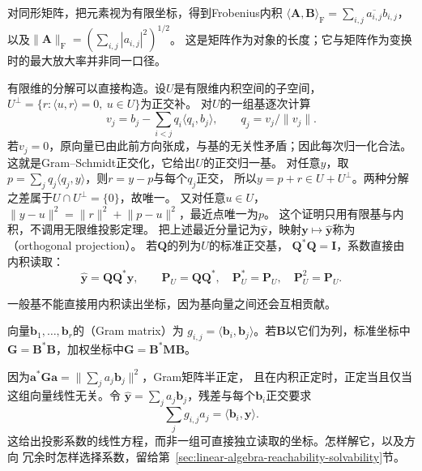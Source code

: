 对同形矩阵，把元素视为有限坐标，得到Frobenius内积
$\langle\bm A,\bm B\rangle_{\mathrm F}=\sum_{i,j}\overline{a_{i,j}}b_{i,j}$，
以及$\lVert\bm A\rVert_{\mathrm F}=(\sum_{i,j}|a_{i,j}|^2)^{1/2}$。
这是矩阵作为对象的长度；它与矩阵作为变换时的最大放大率并非同一口径。


有限维的分解可以直接构造。设$U$是有限维内积空间的子空间，
$U^\perp=\{r:\langle u,r\rangle=0,\ u\in U\}$为正交补。
对$U$的一组基逐次计算
\[
 v_j=b_j-\sum_{i<j}q_i\langle q_i,b_j\rangle,\qquad q_j=v_j/\lVert v_j\rVert.
\]
若$v_j=0$，原向量已由此前方向张成，与基的无关性矛盾；因此每次归一化合法。
这就是Gram--Schmidt正交化，它给出$U$的正交归一基。
对任意$y$，取$p=\sum_j q_j\langle q_j,y\rangle$，则$r=y-p$与每个$q_j$正交，
所以$y=p+r\in U+U^\perp$。两种分解之差属于$U\cap U^\perp=\{0\}$，故唯一。
又对任意$u\in U$，
$\lVert y-u\rVert^2=\lVert r\rVert^2+\lVert p-u\rVert^2$，最近点唯一为$p$。
这个证明只用有限基与内积，不调用无限维投影定理。
把上述最近分量记为$\widehat{\bm y}$，映射$\bm y\mapsto\widehat{\bm y}$称为
（orthogonal projection）。
若$\bm Q$的列为$U$的标准正交基，
$\bm Q^*\bm Q=\bm I$，系数直接由内积读取：
\begin{equation}
 \widehat{\bm y}=\bm Q\bm Q^*\bm y,\qquad
 \bm P_U=\bm Q\bm Q^*,\quad \bm P_U^*=\bm P_U,\quad\bm P_U^2=\bm P_U.
 \label{eq:linear-algebra-orthogonal-projector}
\end{equation}

一般基不能直接用内积读出坐标，因为基向量之间还会互相贡献。
\begin{definition}[有限向量族的Gram矩阵]
\label{def:linear-algebra-gram-matrix}
向量$\bm b_1,\ldots,\bm b_r$的（Gram matrix）为
$g_{i,j}=\langle\bm b_i,\bm b_j\rangle$。若$\bm B$以它们为列，标准坐标中
$\bm G=\bm B^*\bm B$，加权坐标中$\bm G=\bm B^*\bm M\bm B$。
\end{definition}
因为$\bm a^*\bm G\bm a=\lVert\sum_j a_j\bm b_j\rVert^2$，Gram矩阵半正定，
且在内积正定时，正定当且仅当这组向量线性无关。令
$\widehat{\bm y}=\sum_j a_j\bm b_j$，残差与每个$\bm b_i$正交要求
\[
 \sum_j g_{i,j}a_j=\langle\bm b_i,\bm y\rangle.
\]
这给出投影系数的线性方程，而非一组可直接独立读取的坐标。怎样解它，以及方向
冗余时怎样选择系数，留给第~\ref{sec:linear-algebra-reachability-solvability}节。

